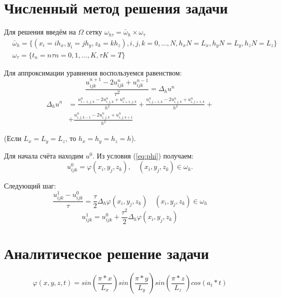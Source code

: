 \documentclass{article}
\begin{document}
\section*{Численный метод решения задачи}
Для решения введём на $\Omega$ сетку $\omega_{h \tau} = \bar{\omega}_h \times \omega_{\tau}$
\begin{align*}
    &\bar{\omega}_h = \{(x_i = ih_x, y_i = jh_y, z_k = kh_z), i, j, k = 0, ..., N, h_x N = L_x, h_y N = L_y, h_z N = L_z\}\\
    &\omega_{\tau} = \{t_n = n\tau n = 0, 1, ..., K, \tau K = T\}
\end{align*}
 
Для аппроксимации уравнения воспользуемся равенством:
\begin{equation}
    \frac{u_{ijk}^{n+1} - 2 u_{ijk}^n + u_{ijk}^{n - 1}}{\tau^2} = \Delta_h u^n 
\end{equation}
\begin{align}
    \Delta_h u^n &= \frac{u_{i-1,j,k}^n - 2 u_{i,j,k}^n + u_{i+1,j,k}^n}{h^2} + \frac{u_{i,j-1,k}^n - 2 u_{i,j,k}^n + u_{i,j+1,k}^n}{h^2} +\\
    &+ \frac{u_{i,j,k-1}^n - 2 u_{i,j,k}^n + u_{i,j,k+1}^n}{h^2}
\end{align}
 
(Если $L_x = L_y = L_z$, то $h_x = h_y = h_z = h$).
 
Для начала счёта находим $u^0$. Из условия (\ref{eq:phi}) получаем:
\begin{equation}
    u_{ijk}^0 = \varphi (x_i, y_j, z_k), \quad (x_i, y_j, z_k) \in \omega_h.
\end{equation}
 
Следующий шаг:
\begin{equation}
    \frac{u_{ijk}^1 - u_{ijk}^0}{\tau} = \frac{\tau}{2}\Delta_h \varphi (x_i, y_j, z_k) \quad (x_i, y_j, z_k) \in \omega_h
\end{equation}
\begin{equation}
    u_{ijk}^1 = u_{ijk}^0 + \frac{\tau ^ 2}{2} \Delta_h \varphi (x_i, y_j, z_k)
\end{equation}

\section{Аналитическое решение задачи}
    \begin{equation}
        \varphi (x, y, z, t) = sin(\frac{\pi * x}{L_x})sin(\frac{\pi * y}{L_y})sin(\frac{\pi * z}{L_z})cos(a_t * t)
    \end{equation}
\end{document}
